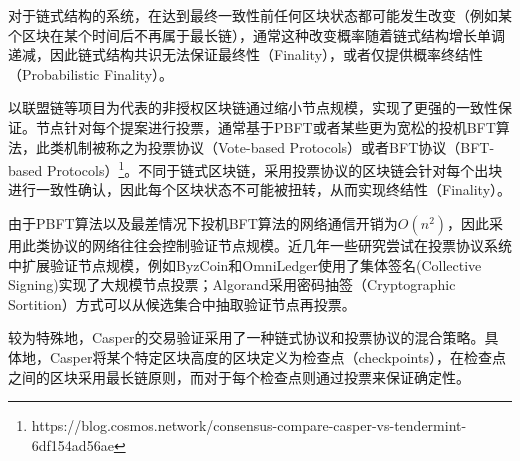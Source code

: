 对于链式结构的系统，在达到最终一致性前任何区块状态都可能发生改变（例如某个区块在某个时间后不再属于最长链），通常这种改变概率随着链式结构增长单调递减\cite{nakamoto2008bitcoin}，因此链式结构共识无法保证最终性（Finality），或者仅提供概率终结性（Probabilistic Finality）\cite{wang2019survey}。


以联盟链等项目为代表的非授权区块链通过缩小节点规模，实现了更强的一致性保证。节点针对每个提案进行投票，通常基于PBFT\cite{castro1999practical}或者某些更为宽松的投机BFT算法\cite{kotla2007zyzzyva}，此类机制被称之为投票协议（Vote-based Protocols）或者BFT协议（BFT-based Protocols）\footnote{https://blog.cosmos.network/consensus-compare-casper-vs-tendermint-6df154ad56ae}。不同于链式区块链，采用投票协议的区块链会针对每个出块进行一致性确认，因此每个区块状态不可能被扭转，从而实现终结性（Finality）。

由于PBFT算法以及最差情况下投机BFT算法的网络通信开销为$O(n^2)$，因此采用此类协议的网络往往会控制验证节点规模\cite{castro1999practical,kotla2007zyzzyva}。近几年一些研究尝试在投票协议系统中扩展验证节点规模，例如ByzCoin\cite{kogias2016enhancing}和OmniLedger\cite{kokoris2018omniledger}使用了集体签名(Collective Signing)实现了大规模节点投票；Algorand\cite{gilad2017algorand}采用密码抽签（Cryptographic Sortition）方式可以从候选集合中抽取验证节点再投票。

较为特殊地，Casper\cite{buterin2017casper}的交易验证采用了一种链式协议和投票协议的混合策略。具体地，Casper将某个特定区块高度的区块定义为检查点（checkpoints），在检查点之间的区块采用最长链原则，而对于每个检查点则通过投票来保证确定性。













